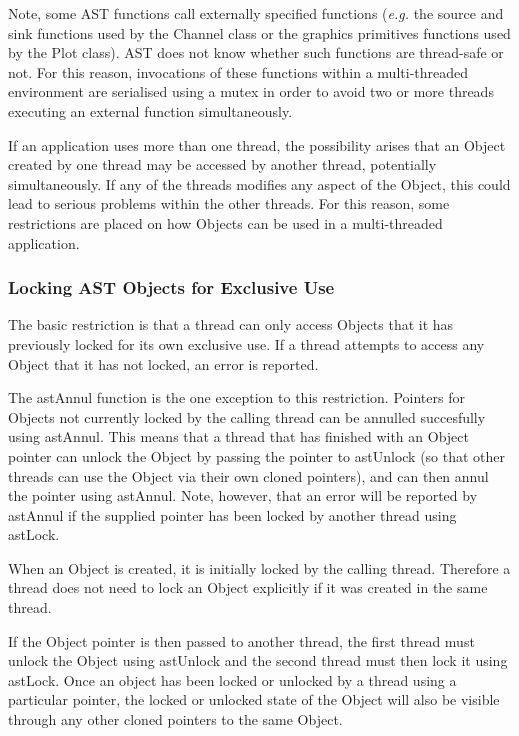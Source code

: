 \documentclass[twoside,11pt]{starlink}
\begin{document}
Note, some AST functions call externally specified functions (\emph{e.g.}
the source and sink functions used by the Channel class or the graphics
primitives functions used by the Plot class). AST does not know whether
such functions are thread-safe or not. For this reason, invocations of these
functions within a multi-threaded environment are serialised using a mutex
in order to avoid two or more threads executing an external function
simultaneously.

If an application uses more than one thread, the possibility arises that
an Object created by one thread may be accessed by another thread, potentially
simultaneously. If any of the threads modifies any aspect of the Object,
this could lead to serious problems within the other threads. For this
reason, some restrictions are placed on how Objects can be used in a
multi-threaded application.

\subsubsection{Locking AST Objects for Exclusive Use}
The basic restriction is that a thread can only access Objects that it
has previously locked for its own exclusive use. If a thread attempts to
access any Object that it has not locked, an error is reported.

The astAnnul function is the one exception to this restriction. Pointers
for Objects not currently locked by the calling thread can be annulled
succesfully using astAnnul. This means that a thread that has finished
with an Object pointer can unlock the Object by passing the pointer to
astUnlock (so that other threads can use the Object via their own cloned
pointers), and can then annul the pointer using astAnnul. Note, however,
that an error will be reported by astAnnul if the supplied pointer has
been locked by another thread using astLock.

When an Object is created, it is initially locked by the calling thread.
Therefore a thread does not need to lock an Object explicitly if it was
created in the same thread.

If the Object pointer is then passed to another thread, the first thread
must unlock the Object using astUnlock and the second thread must then lock
it using astLock. Once an object has been locked or unlocked by a thread
using a particular pointer, the locked or unlocked state of the Object
will also be visible through any other cloned pointers to the same Object.
\end{document}

